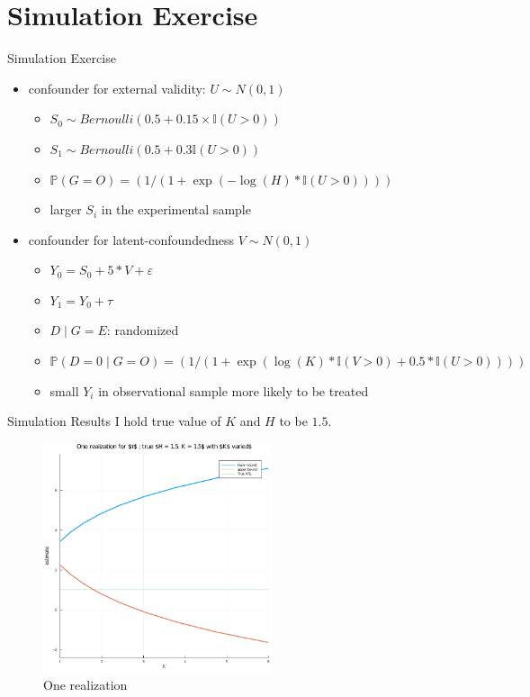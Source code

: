 \documentclass{beamer}					%
\begin{document}
\section{Simulation Exercise}
\begin{frame}{Simulation Exercise}
    \begin{itemize}
        \item confounder for external validity: $U \sim N(0,1)$
        \begin{itemize}
            \item $S_0 \sim Bernoulli(0.5 + 0.15 \times \mathbb{I}(U > 0))$
        \item $S_1 \sim Bernoulli(0.5 + 0.3 \mathbb{I}(U > 0))$
        \item $\mathbb{P}(G = O) = (1 / (1 + \exp (-\log(H) * \mathbb{I}(U > 0) )))$
        \item larger $S_i$ in the experimental sample
        \end{itemize}
        
        \item confounder for latent-confoundedness $V \sim N(0,1)$
        \begin{itemize}
            \item $Y_0 = S_0 + 5 * V + \varepsilon$
        \item $Y_1 = Y_0 + \tau$
        \item $D \mid G = E$: randomized
        \item $\mathbb{P}(D = 0 \mid G = O) = (1 / (1 + \exp (\log(K) * \mathbb{I}(V > 0) + 0.5 * \mathbb{I}(U > 0) )))$
        \item small $Y_i$ in observational sample more likely to be treated
        \end{itemize}
    \end{itemize}
\end{frame}

\begin{frame}{Simulation Results}
    I hold true value of $K$ and $H$ to be $1.5$.
    \begin{figure}
        \centering
        \includegraphics[width=0.6\textwidth]{../code/fig1.png}
        \caption{One realization}
        \label{fig:fig1}
    \end{figure}
\end{frame}
\end{document}
